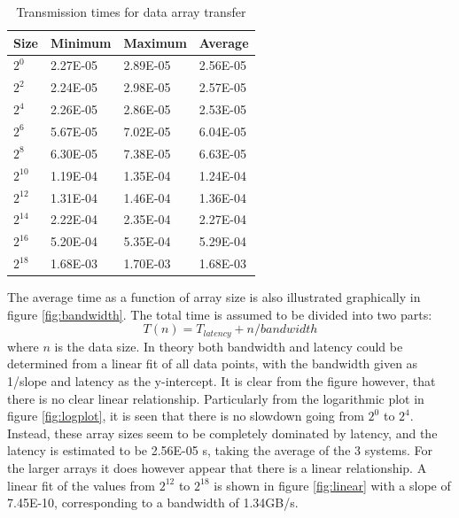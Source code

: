 \documentclass{article}
\begin{document}
\begin{table}[!h]
\caption{Transmission times for data array transfer}
\label{tab:bandwidth}
\centering
\begin{tabular}{|l|l|l|l|}
\hline
Size & Minimum  & Maximum  & Average  \\ \hline
$2^{0}$  & 2.27E-05 & 2.89E-05 & 2.56E-05 \\ \hline
$2^{2}$  & 2.24E-05 & 2.98E-05 & 2.57E-05 \\ \hline
$2^{4}$  & 2.26E-05 & 2.86E-05 & 2.53E-05 \\ \hline
$2^{6}$  & 5.67E-05 & 7.02E-05 & 6.04E-05 \\ \hline
$2^{8}$  & 6.30E-05 & 7.38E-05 & 6.63E-05 \\ \hline
$2^{10}$ & 1.19E-04 & 1.35E-04 & 1.24E-04 \\ \hline
$2^{12}$ & 1.31E-04 & 1.46E-04 & 1.36E-04 \\ \hline
$2^{14}$ & 2.22E-04 & 2.35E-04 & 2.27E-04 \\ \hline
$2^{16}$ & 5.20E-04 & 5.35E-04 & 5.29E-04 \\ \hline
$2^{18}$ & 1.68E-03 & 1.70E-03 & 1.68E-03 \\ \hline
\end{tabular}
\end{table}
 The average time as a function of array size is also illustrated graphically in figure \ref{fig:bandwidth}. The total time is assumed to be divided into two parts:
 \begin{equation}
     T(n) = T_{latency} + n/bandwidth
 \end{equation}
 where $n$ is the data size. In theory both bandwidth and latency could be determined from a linear fit of all data points, with the bandwidth given as 1/slope and latency as the y-intercept. It is clear from the figure however, that there is no clear linear relationship. Particularly from the logarithmic plot in figure \ref{fig:logplot}, it is seen that there is no slowdown going from $2^0$ to $2^4$. Instead, these array sizes seem to be completely dominated by latency, and the latency is estimated to be 2.56E-05 s, taking the average of the 3 systems. For the larger arrays it does however appear that there is a linear relationship. A linear fit of the values from $2^{12}$ to $2^{18}$ is shown in figure \ref{fig:linear} with a slope of 7.45E-10, corresponding to a bandwidth of 1.34GB/s.
\end{document}
